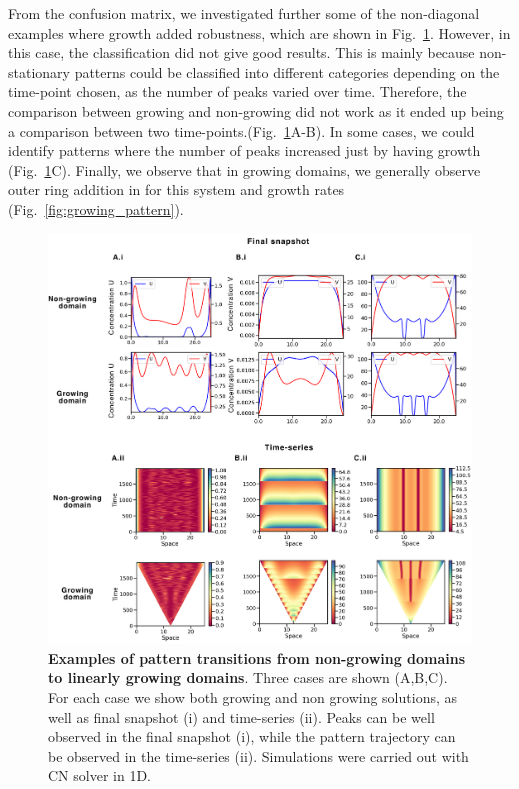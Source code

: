 From the confusion matrix, we investigated further some of the non-diagonal examples where growth added robustness, which are shown in Fig.~\ref{fig:interesting_cases_edgegrowth2}.
 However, in this case, the classification did not give good results.
This is mainly because non-stationary patterns could be classified into different categories depending on the time-point chosen, as the number of peaks varied over time.
Therefore, the comparison between growing and non-growing did not work as it ended up being a comparison between two time-points.(Fig.~\ref{fig:interesting_cases_edgegrowth2}A-B).
In some cases, we could identify patterns where the number of peaks increased just by having growth (Fig.~\ref{fig:interesting_cases_edgegrowth2}C).
Finally, we observe that in growing domains, we generally observe outer ring addition in for this system and growth rates (Fig.~\ref{fig:growing_pattern}).
\begin{figure}[H] %

    \centering
    \begin{adjustbox}{center}
        \includegraphics[width=1\textwidth]{chapters/Chapter 1/interesting_cases_edgegrowth2} %
    \end{adjustbox}
    \caption{\textbf{Examples of pattern transitions from non-growing domains to linearly growing domains}. Three cases are shown (A,B,C). For each case we show both growing and non growing solutions, as well as final snapshot (i) and time-series (ii). Peaks can be well observed in the final snapshot (i), while the pattern trajectory can be observed in the time-series (ii). Simulations were carried out with CN solver in 1D.}
    \label{fig:interesting_cases_edgegrowth2}
\end{figure}
